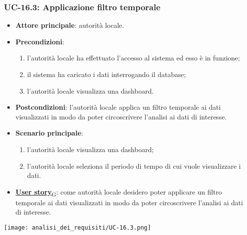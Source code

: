 \subsubsection{UC-16.3: Applicazione filtro temporale}
\begin{itemize}
	\item \textbf{Attore principale}: autorità locale.
	\item \textbf{Precondizioni}:
	      \begin{enumerate}
		      \item l'autorità locale ha effettuato l'accesso al sistema ed esso è in funzione;
		      \item il sistema ha caricato i dati interrogando il database;
		      \item l'autorità locale visualizza una dashboard.
	      \end{enumerate}
	\item \textbf{Postcondizioni}: l'autorità locale applica un filtro temporale ai dati visualizzati in modo da poter circoscrivere l'analisi ai dati di interesse.
	\item \textbf{Scenario principale}:
	      \begin{enumerate}
		      \item l'autorità locale visualizza una dashboard;
		      \item l'autorità locale seleziona il periodo di tempo di cui vuole visualizzare i dati.
	      \end{enumerate}
	\item \href{https://7last.github.io/docs/pb/documentazione-interna/glossario\#user-story}{\textbf{User story}\textsubscript{G}}:
	      come autorità locale desidero poter applicare un filtro temporale ai dati visualizzati in modo da poter circoscrivere l'analisi ai dati di interesse.
\end{itemize}
\begin{center}
	\texttt{[image: analisi\_dei\_requisiti/UC-16.3.png]}
\end{center}

